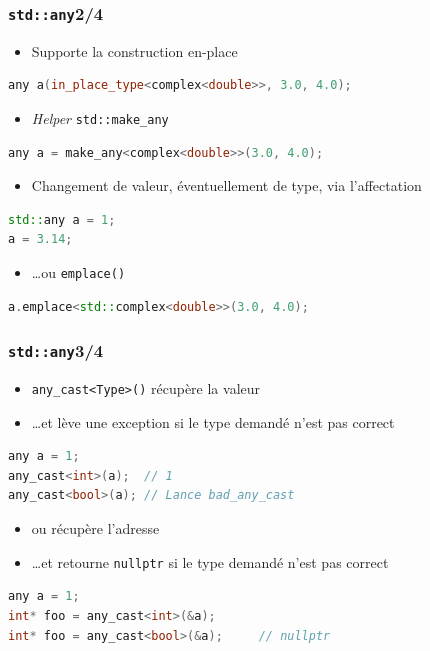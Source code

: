 \documentclass[C++.tex]{subfiles}
\begin{document}
\begin{frame}[fragile]
	\frametitle{\lstinline|std::any|\titlehfill{}2/4}
	\begin{itemize}
		\item Supporte la construction en-place
	\end{itemize}

	\begin{lstlisting}[language=C++]
any a(in_place_type<complex<double>>, 3.0, 4.0);\end{lstlisting}

	\begin{itemize}
		\item \textit{Helper} \lstinline|std::make_any|
	\end{itemize}

	\begin{lstlisting}[language=C++]
any a = make_any<complex<double>>(3.0, 4.0);\end{lstlisting}

	\begin{itemize}
		\item Changement de valeur, éventuellement de type, via l'affectation
	\end{itemize}

	\begin{lstlisting}[language=C++]
std::any a = 1;
a = 3.14;
\end{lstlisting}
	
	\begin{itemize}
		\item \ldots ou \lstinline|emplace()|
	\end{itemize}

	\begin{lstlisting}[language=C++]
a.emplace<std::complex<double>>(3.0, 4.0);\end{lstlisting}
\end{frame}

\begin{frame}[fragile]
	\frametitle{\lstinline|std::any|\titlehfill{}3/4}
	\begin{itemize}
		\item \lstinline|any_cast<Type>()| récupère la valeur
		\item \ldots{}et lève une exception si le type demandé n'est pas correct
	\end{itemize}

	\begin{lstlisting}[language=C++]
any a = 1;
any_cast<int>(a);  // 1
any_cast<bool>(a); // Lance bad_any_cast\end{lstlisting}

	\begin{itemize}
		\item ou récupère l'adresse
		\item \ldots{}et retourne \lstinline|nullptr| si le type demandé n'est pas correct
	\end{itemize}

	\begin{lstlisting}[language=C++]
any a = 1;
int* foo = any_cast<int>(&a);
int* foo = any_cast<bool>(&a);     // nullptr\end{lstlisting}
\end{frame}
\end{document}
